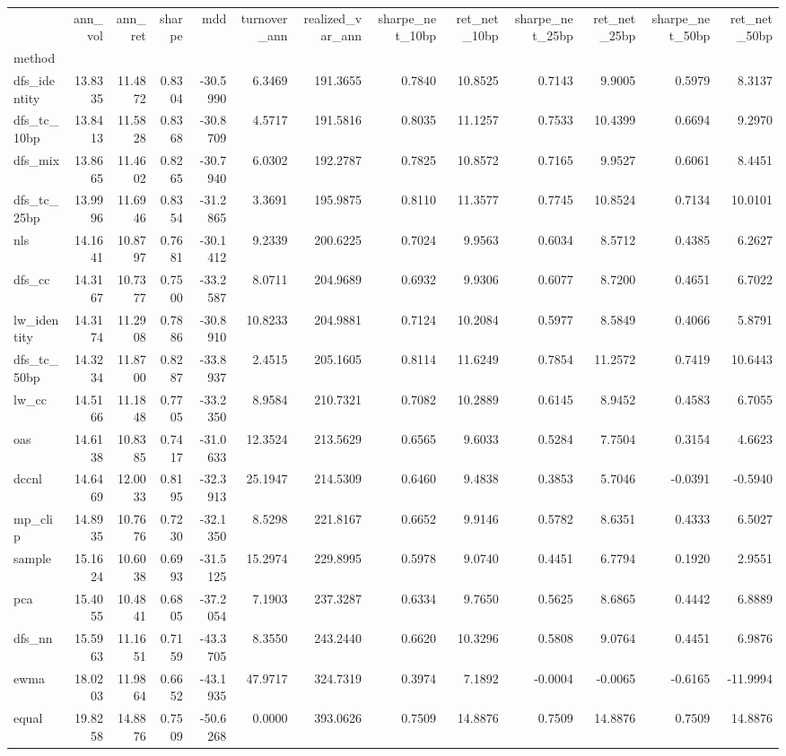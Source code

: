 \begin{tabular}{lrrrrrrrrrrrr}
\toprule
 & ann_vol & ann_ret & sharpe & mdd & turnover_ann & realized_var_ann & sharpe_net_10bp & ret_net_10bp & sharpe_net_25bp & ret_net_25bp & sharpe_net_50bp & ret_net_50bp \\
method &  &  &  &  &  &  &  &  &  &  &  &  \\
\midrule
dfs_identity & 13.8335 & 11.4872 & 0.8304 & -30.5990 & 6.3469 & 191.3655 & 0.7840 & 10.8525 & 0.7143 & 9.9005 & 0.5979 & 8.3137 \\
dfs_tc_10bp & 13.8413 & 11.5828 & 0.8368 & -30.8709 & 4.5717 & 191.5816 & 0.8035 & 11.1257 & 0.7533 & 10.4399 & 0.6694 & 9.2970 \\
dfs_mix & 13.8665 & 11.4602 & 0.8265 & -30.7940 & 6.0302 & 192.2787 & 0.7825 & 10.8572 & 0.7165 & 9.9527 & 0.6061 & 8.4451 \\
dfs_tc_25bp & 13.9996 & 11.6946 & 0.8354 & -31.2865 & 3.3691 & 195.9875 & 0.8110 & 11.3577 & 0.7745 & 10.8524 & 0.7134 & 10.0101 \\
nls & 14.1641 & 10.8797 & 0.7681 & -30.1412 & 9.2339 & 200.6225 & 0.7024 & 9.9563 & 0.6034 & 8.5712 & 0.4385 & 6.2627 \\
dfs_cc & 14.3167 & 10.7377 & 0.7500 & -33.2587 & 8.0711 & 204.9689 & 0.6932 & 9.9306 & 0.6077 & 8.7200 & 0.4651 & 6.7022 \\
lw_identity & 14.3174 & 11.2908 & 0.7886 & -30.8910 & 10.8233 & 204.9881 & 0.7124 & 10.2084 & 0.5977 & 8.5849 & 0.4066 & 5.8791 \\
dfs_tc_50bp & 14.3234 & 11.8700 & 0.8287 & -33.8937 & 2.4515 & 205.1605 & 0.8114 & 11.6249 & 0.7854 & 11.2572 & 0.7419 & 10.6443 \\
lw_cc & 14.5166 & 11.1848 & 0.7705 & -33.2350 & 8.9584 & 210.7321 & 0.7082 & 10.2889 & 0.6145 & 8.9452 & 0.4583 & 6.7055 \\
oas & 14.6138 & 10.8385 & 0.7417 & -31.0633 & 12.3524 & 213.5629 & 0.6565 & 9.6033 & 0.5284 & 7.7504 & 0.3154 & 4.6623 \\
dccnl & 14.6469 & 12.0033 & 0.8195 & -32.3913 & 25.1947 & 214.5309 & 0.6460 & 9.4838 & 0.3853 & 5.7046 & -0.0391 & -0.5940 \\
mp_clip & 14.8935 & 10.7676 & 0.7230 & -32.1350 & 8.5298 & 221.8167 & 0.6652 & 9.9146 & 0.5782 & 8.6351 & 0.4333 & 6.5027 \\
sample & 15.1624 & 10.6038 & 0.6993 & -31.5125 & 15.2974 & 229.8995 & 0.5978 & 9.0740 & 0.4451 & 6.7794 & 0.1920 & 2.9551 \\
pca & 15.4055 & 10.4841 & 0.6805 & -37.2054 & 7.1903 & 237.3287 & 0.6334 & 9.7650 & 0.5625 & 8.6865 & 0.4442 & 6.8889 \\
dfs_nn & 15.5963 & 11.1651 & 0.7159 & -43.3705 & 8.3550 & 243.2440 & 0.6620 & 10.3296 & 0.5808 & 9.0764 & 0.4451 & 6.9876 \\
ewma & 18.0203 & 11.9864 & 0.6652 & -43.1935 & 47.9717 & 324.7319 & 0.3974 & 7.1892 & -0.0004 & -0.0065 & -0.6165 & -11.9994 \\
equal & 19.8258 & 14.8876 & 0.7509 & -50.6268 & 0.0000 & 393.0626 & 0.7509 & 14.8876 & 0.7509 & 14.8876 & 0.7509 & 14.8876 \\
\bottomrule
\end{tabular}
